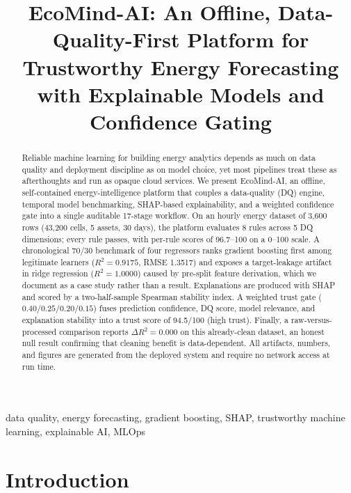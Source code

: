 \documentclass[conference]{IEEEtran}
\begin{document}
\title{EcoMind-AI: An Offline, Data-Quality-First Platform for Trustworthy Energy Forecasting with Explainable Models and Confidence Gating}

\author{
}

\maketitle

\begin{abstract}
Reliable machine learning for building energy analytics depends as much on data quality and deployment discipline as on model choice, yet most pipelines treat these as afterthoughts and run as opaque cloud services. We present EcoMind-AI, an offline, self-contained energy-intelligence platform that couples a data-quality (DQ) engine, temporal model benchmarking, SHAP-based explainability, and a weighted confidence gate into a single auditable 17-stage workflow. On an hourly energy dataset of 3{,}600 rows (43{,}200 cells, 5 assets, 30 days), the platform evaluates 8 rules across 5 DQ dimensions; every rule passes, with per-rule scores of 96.7--100 on a 0--100 scale. A chronological 70/30 benchmark of four regressors ranks gradient boosting first among legitimate learners ($R^2=0.9175$, RMSE 1.3517) and exposes a target-leakage artifact in ridge regression ($R^2=1.0000$) caused by pre-split feature derivation, which we document as a case study rather than a result. Explanations are produced with SHAP and scored by a two-half-sample Spearman stability index. A weighted trust gate ($0.40/0.25/0.20/0.15$) fuses prediction confidence, DQ score, model relevance, and explanation stability into a trust score of 94.5/100 (high trust). Finally, a raw-versus-processed comparison reports $\Delta R^2 = 0.000$ on this already-clean dataset, an honest null result confirming that cleaning benefit is data-dependent. All artifacts, numbers, and figures are generated from the deployed system and require no network access at run time.
\end{abstract}

\begin{IEEEkeywords}
data quality, energy forecasting, gradient boosting, SHAP, trustworthy machine learning, explainable AI, MLOps
\end{IEEEkeywords}

\section{Introduction}
\end{document}
